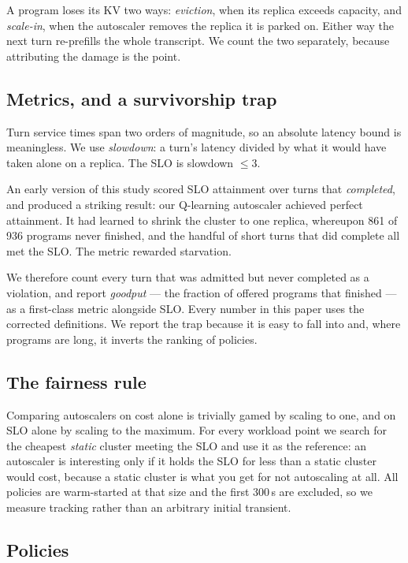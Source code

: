 \documentclass[sigconf,nonacm]{acmart}
\begin{document}
A program loses its KV two ways: \emph{eviction}, when its replica exceeds
capacity, and \emph{scale-in}, when the autoscaler removes the replica it
is parked on. Either way the next turn re-prefills the whole transcript.
We count the two separately, because attributing the damage is the point.

\subsection{Metrics, and a survivorship trap}
\label{sec:metrics}

Turn service times span two orders of magnitude, so an absolute latency
bound is meaningless. We use \emph{slowdown}: a turn's latency divided by
what it would have taken alone on a replica. The SLO is slowdown $\le3$.

An early version of this study scored SLO attainment over turns that
\emph{completed}, and produced a striking result: our Q-learning
autoscaler achieved perfect attainment. It had learned to shrink the
cluster to one replica, whereupon 861 of 936 programs never finished, and
the handful of short turns that did complete all met the SLO. The metric
rewarded starvation.

We therefore count every turn that was admitted but never completed as a
violation, and report \emph{goodput} --- the fraction of offered programs
that finished --- as a first-class metric alongside SLO. Every number in
this paper uses the corrected definitions. We report the trap because it
is easy to fall into and, where programs are long, it inverts the ranking
of policies.

\subsection{The fairness rule}

Comparing autoscalers on cost alone is trivially gamed by scaling to one,
and on SLO alone by scaling to the maximum. For every workload point we
search for the cheapest \emph{static} cluster meeting the SLO and use it
as the reference: an autoscaler is interesting only if it holds the SLO
for less than a static cluster would cost, because a static cluster is
what you get for not autoscaling at all. All policies are warm-started at
that size and the first 300\,s are excluded, so we measure tracking rather
than an arbitrary initial transient.

\subsection{Policies}
\end{document}

